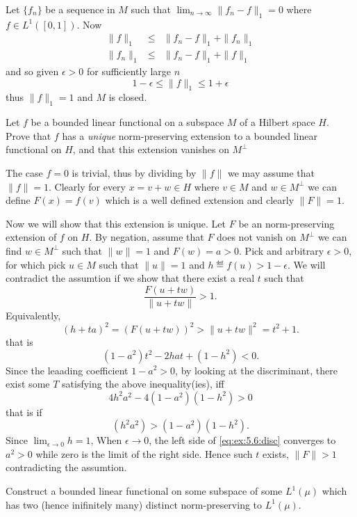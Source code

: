 \begin{enumerate}
Let \(\{f_n\}\) be a sequence in $M$ such that
\(\lim_{n\to\infty}\|f_n - f\|_1 = 0\)
where \(f\in L^1([0,1])\). Now
\begin{eqnarray*}
\|f\|_1 &\leq& \|f_n - f\|_1 + \|f_n\|_1 \\
 \|f_n\|_1 &\leq& \|f_n - f\|_1 + \|f\|_1
\end{eqnarray*}
and so given \(\epsilon > 0\) for sufficiently large $n$
\[ 1 - \epsilon \leq \|f\|_1 \leq 1 + \epsilon\]
thus \(\|f\|_1=1\) and $M$ is closed.



\begin{excopy}
Let $f$ be a bounded linear functional on a subspace $M$ of a Hilbert space $H$.
Prove that $f$ has a \emph{unique} norm-preserving extension to a bounded
linear functional on $H$, and that this extension vanishes on \(M^\perp\)
\end{excopy}

The case \(f=0\) is trivial, thus \wlogy by dividing by \(\|f\|\)
we may assume that \(\|f\|=1\).
Clearly for every
\(x=v+w\in H\) where \(v\in M\) and \(w\in M^\perp\)
we can define \(F(x) = f(v)\) which is a well defined extension
and clearly \(\|F\|=1\).

Now we will show that this extension is unique.
Let $F$ be an norm-preserving extension of $f$ on $H$.
By negation, assume that $F$ does not vanish on \(M^\perp\)
we can find \(w\in M^\perp\) such that \(\|w\|=1\)
and \(F(w)=a>0\). Pick and arbitrary \(\epsilon > 0\),
for which pick \(u\in M\) such that \(\|u\|=1\)
and \(h \eqdef f(u) > 1-\epsilon\).
We will contradict the assumtion if we show
that there exist a real $t$ such that
\[\frac{F(u+tw)}{\|u+tw\|} > 1.\]
Equivalently,
\[(h+ta)^2 = (F(u+tw))^2 > \|u+tw\|^2 = t^2 + 1.\]
that is
\[(1-a^2)t^2 - 2hat + (1-h^2) < 0.\]
Since the leaading coefficient \(1-a^2>0\),
by looking at the discriminant, there exist some $T$
satisfying the above inequality(ies), iff
\[4h^2a^2 - 4(1-a^2)(1-h^2) > 0\]
that is if
\begin{equation} \label{eq:ex:5.6:disc}
(h^2a^2)>(1-a^2)(1-h^2).
\end{equation}
Since \(\lim_{\epsilon\to 0} h = 1\),
When \(\epsilon\to 0\), the left side of \eqref{eq:ex:5.6:disc}
converges to \(a^2 > 0\) while zero is the limit of the right side.
Hence such $t$ exists, \(\|F\|>1\) contradicting the assumtion.


\begin{excopy}
Construct a bounded linear functional on some subspace of some \(L^1(\mu)\)
which has two (hence inifinitely many) distinct norm-preserving
to \(L^1(\mu)\).
\end{excopy}


\end{enumerate}
